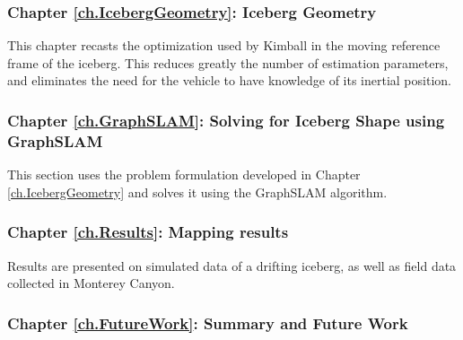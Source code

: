 \subsubsection*{Chapter \ref{ch.IcebergGeometry}: Iceberg Geometry}  This chapter recasts the optimization used by Kimball \cite{Kimball2011b} in the moving reference frame of the iceberg. This reduces greatly the number of estimation parameters, and eliminates the need for the vehicle to have knowledge of its inertial position.

\subsubsection*{Chapter \ref{ch.GraphSLAM}: Solving for Iceberg Shape using GraphSLAM} This section uses the problem formulation developed in Chapter \ref{ch.IcebergGeometry} and solves it using the GraphSLAM algorithm.

\subsubsection*{Chapter \ref{ch.Results}: Mapping results} Results are presented on simulated data of a drifting iceberg, as well as field data collected in Monterey Canyon. 

\subsubsection*{Chapter \ref{ch.FutureWork}: Summary and Future Work}


